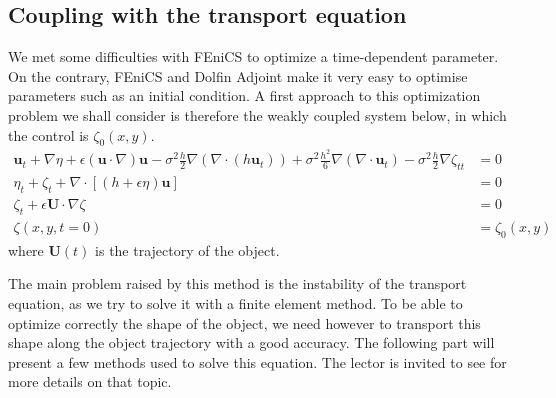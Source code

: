 \documentclass[11pt,a4paper]{article}
\begin{document}
		\subsection{Coupling with the transport equation}
			We met some difficulties with FEniCS to optimize a time-dependent parameter. On the contrary, FEniCS and Dolfin Adjoint make it very easy to optimise parameters	such as an initial condition. A first approach to this optimization problem we shall consider is therefore the weakly coupled system below, in which the control is $\zeta_0(x,y)$.
		\begin{align}
			\mathbf{u}_t + \nabla \eta + \epsilon (\mathbf{u} \cdot \nabla)\mathbf{u} - \sigma^2\frac{h}{2}\nabla (\nabla \cdot (h \mathbf{u}_t)) + \sigma^2 \frac{h^2}{6}\nabla (\nabla \cdot \mathbf{u}_t) - \sigma^2\frac{h}{2}\nabla \zeta_{tt}  &= 0\\
			\eta_t+\zeta_t + \nabla \cdot [(h+\epsilon\eta)\mathbf{u}] &= 0 \\
			\zeta_t + \epsilon \mathbf{U} \cdot \nabla \zeta &= 0\\
			\zeta(x,y,t=0) &= \zeta_0(x,y)
		\end{align}
		where $\mathbf{U}(t)$ is the trajectory of the object.
				
				The main problem raised by this method is the instability of the transport equation, as we try to solve it with a finite element method. To be able to optimize correctly the shape of the object, we need however to transport this shape along the object trajectory with a good accuracy. The following part will present a few methods used to solve this equation. The lector is invited to see \cite{Transport} for more details on that topic.
				
\end{document}
